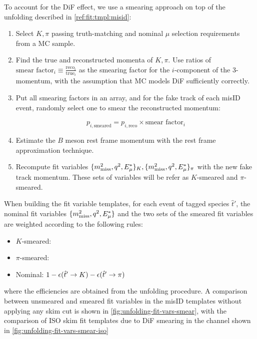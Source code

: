 To account for the DiF effect, we use a smearing approach on top of the
unfolding described in \cref{ref:fit:tmpl:misid}:

\begin{enumerate}
    \item Select $K, \pi$ passing truth-matching and nominal $\mu$ selection
        requirements from a MC sample.

    \item Find the true and reconstructed momenta of
        $K, \pi$.
        Use ratios of
        $\text{smear factor}_i \equiv \frac{\text{reco}_i}{\text{true}_i}$
        as the smearing factor for the $i$-component of the 3-momentum,
        with the assumption that MC models DiF sufficiently correctly.

    \item Put all smearing factors in an array,
        and for the fake \muon track of each misID event,
        randomly select one to smear the reconstructed momentum:

        \begin{equation}
            p_{i,\text{smeared}} =
                p_{i,\text{reco}} \times \text{smear factor}_i
        \end{equation}

    \item Estimate the $B$ meson rest frame momentum with the rest frame
        approximation technique. %
    \item Recompute fit variables
        $\{\mmSq, \qSq, \el\}_K, \{\mmSq, \qSq, \el\}_\pi$
        with the new fake \muon track momentum.
        These sets of variables will be refer as $K$-smeared and $\pi$-smeared.
\end{enumerate}

When building the fit variable templates, for each event of tagged species
$\hat{t}'$,
the nominal fit variables $\{\mmSq, \qSq, \el\}$ and the two sets of the smeared
fit variables are weighted according to the following rules:

\begin{itemize}
    \item $K$-smeared: 
    \item $\pi$-smeared: \misEff[\hat{t}']{\pi}
    \item Nominal: $1 - \misEff[\hat{t}']{K} - \misEff[\hat{t}']{\pi}$
\end{itemize}
where the efficiencies are obtained from the unfolding procedure.
A comparison between unsmeared and smeared fit variables in the misID templates
without applying any skim cut is shown in \cref{fig:unfolding-fit-vars-smear},
with the comparison of ISO skim fit templates due to DiF smearing in the \Dz
channel shown in \cref{fig:unfolding-fit-vars-smear-iso}

